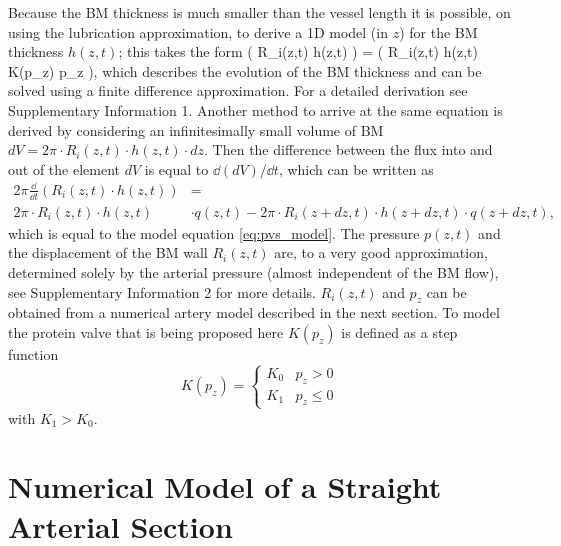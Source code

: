 \documentclass[a4paper,titlepage]{scrartcl}
\begin{document}
Because the BM thickness is much smaller than the vessel length it is possible, on using the lubrication approximation, to derive a 1D model (in $z$) for the BM thickness $h(z,t)$; this takes the form
\beq
{} \left( R_i(z,t) \cdot h(z,t) \right) =  \left( R_i(z,t) \cdot h(z,t) \cdot K(p_{z}) \cdot p_{z} \right),\label{eq:pvs_model}
\eeq
which describes the evolution of the BM thickness and can be solved using a finite difference approximation. For a detailed derivation see Supplementary Information 1. Another method to arrive at the same equation is derived by considering an infinitesimally small volume of BM $dV = 2\pi \cdot R_i(z,t) \cdot h(z,t) \cdot dz$. Then the difference between the flux into and out of the element $dV$ is equal to $\dd (dV)/ \dd t$, which can be written as
\begin{align}
2\pi \frac{\dd}{\dd t} \left( R_i(z,t) \cdot h(z,t) \right) &= \nonumber \\ 
2\pi \cdot R_i(z,t) \cdot h(z,t) & \cdot q(z,t) - 2\pi \cdot R_i(z + dz,t) \cdot h(z + dz,t) \cdot q(z + dz,t),
\end{align}
which is equal to the model equation \eqref{eq:pvs_model}. The pressure $p(z,t)$ and the displacement of the BM wall $R_i(z,t)$ are, to a very good approximation, determined solely by the arterial pressure (\ie almost independent of the BM flow), see Supplementary Information 2 for more details. $R_i(z,t)$ and $p_z$ can be obtained from a numerical artery model described in the next section. To model the protein valve that is being proposed here $K(p_z)$ is defined as a step function
\begin{equation}
  K(p_z) = \begin{cases}
    K_0 & p_z > 0\\
    K_1 & p_z \leq 0
  \end{cases}
\end{equation}
with $K_1 > K_0$.


\section{Numerical Model of a Straight Arterial Section}
\end{document}
